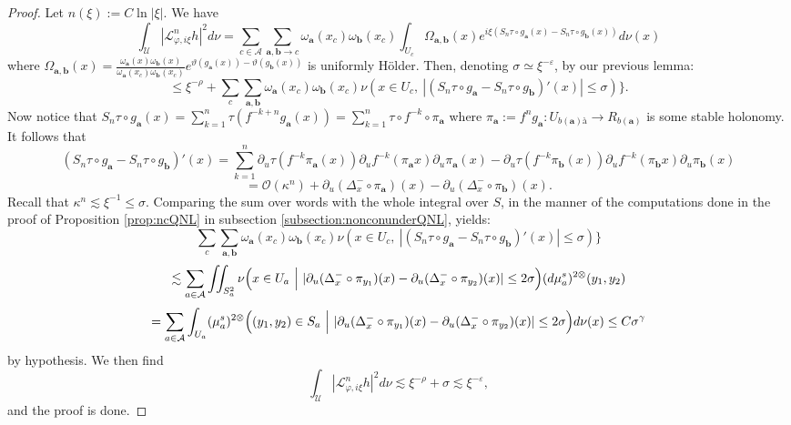 \documentclass[a4paper]{article}
\theoremstyle{definition}
\begin{document}
\begin{proof}

Let $n(\xi) := C \ln |\xi|$. We have
$$ \int_\mathcal{U} |\mathcal{L}_{\varphi,i \xi}^n h|^2 d\nu = \sum_{c \in \mathcal{A}} \sum_{\mathbf{a},\mathbf{b} \rightarrow c} \omega_\mathbf{a}(x_c) \omega_\mathbf{b}(x_c) \int_{U_c} \Omega_{\mathbf{a},\mathbf{b}}(x) e^{i \xi (S_n \tau \circ g_\mathbf{a}(x) - S_n \tau \circ g_\mathbf{b}(x))} d\nu(x) $$
where $\Omega_{\mathbf{a},\mathbf{b}}(x) = \frac{\omega_\mathbf{a}(x)\omega_\mathbf{b}(x)}{\omega_\mathbf{a}(x_c)\omega_\mathbf{b}(x_c)} e^{\vartheta(g_\mathbf{a}(x))-\vartheta(g_\mathbf{b}(x))}$ is uniformly Hölder. Then, denoting $\sigma \simeq \xi^{-\varepsilon}$, by our previous lemma:
$$ \leq \xi^{-\rho} + \sum_c \sum_{\mathbf{a},\mathbf{b}} \omega_\mathbf{a}(x_c) \omega_{\mathbf{b}}(x_c) \nu( x \in U_c, \ |(S_n \tau \circ g_\mathbf{a} - S_n \tau \circ g_\mathbf{b})'(x)| \leq \sigma) \}. $$
Now notice that $ S_n \tau \circ g_\mathbf{a}(x) = \sum_{k=1}^n \tau( f^{-k+n} g_\mathbf{a}(x)) = \sum_{k=1}^{n} \tau \circ f^{-k} \circ \pi_\mathbf{a} $
where $\pi_\mathbf{a}:= f^n g_\mathbf{a} : U_{b(\mathbf{a})à} \rightarrow R_{b(\mathbf{a})}$ is some stable holonomy. It follows that $$ (S_n \tau \circ g_\mathbf{a} - S_n \tau \circ g_\mathbf{b})'(x) = \sum_{k=1}^n \partial_u \tau(f^{-k} \pi_\mathbf{a}(x)) \partial_u f^{-k}(\pi_\mathbf{a} x) \partial_u \pi_\mathbf{a}(x) - \partial_u \tau(f^{-k} \pi_\mathbf{b}(x)) \partial_u f^{-k}(\pi_\mathbf{b} x) \partial_u \pi_\mathbf{b}(x) $$
$$ = \mathcal{O}(\kappa^n) + \partial_u (\Delta^-_x \circ \pi_\mathbf{a} )(x) - \partial_u (\Delta^-_x \circ \pi_\mathbf{b} )(x).$$
Recall that $\kappa^n \lesssim \xi^{-1} \leq \sigma$. Comparing the sum over words with the whole integral over $S$, in the manner of the computations done in the proof of Proposition \ref{prop:ncQNL} in subsection \ref{subsection:nonconunderQNL}, yields:
$$  \sum_c \sum_{\mathbf{a},\mathbf{b}} \omega_\mathbf{a}(x_c) \omega_{\mathbf{b}}(x_c) \nu( x \in U_c, \ |(S_n \tau \circ g_\mathbf{a} - S_n \tau \circ g_\mathbf{b})'(x)| \leq \sigma) \} $$ $$ \lesssim \sum_{a \in \mathcal{A}}\iint_{S_a^2} \nu\Big( x \in U_a \ \Big{|} \ |\partial_u (\Delta^-_x \circ \pi_{y_1} )(x) - \partial_u(\Delta^-_x \circ \pi_{y_2} )(x)| \leq 2\sigma\Big) (d\mu_a^s)^{2 \otimes}( y_1,y_2 ) $$
$$ = \sum_{a \in \mathcal{A}} \int_{U_a} (\mu_a^{s})^{2\otimes }\Big((y_1,y_2) \in S_a \ \Big{|} \   |\partial_u (\Delta^-_x \circ \pi_{y_1} )(x) - \partial_u(\Delta^-_x \circ \pi_{y_2} )(x)| \leq 2\sigma \Big) d\nu(x) \leq C \sigma^{\gamma} $$
by hypothesis. We then find
$$  \int_\mathcal{U} |\mathcal{L}_{\varphi,i \xi}^n h|^2 d\nu \lesssim \xi^{-\rho} + \sigma \lesssim \xi^{-\varepsilon}, $$
and the proof is done.
\end{proof}
\end{document}
